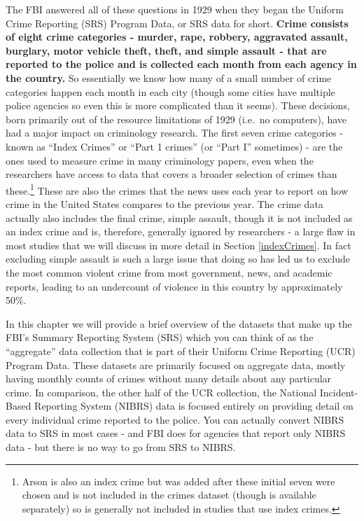 \documentclass[
]{krantz}
\begin{document}
The FBI answered all of these questions in 1929 when they
began the Uniform Crime Reporting (SRS) Program Data, or SRS
data for short. \textbf{Crime consists of eight crime
categories - murder, rape, robbery, aggravated assault,
burglary, motor vehicle theft, theft, and simple assault -
that are reported to the police and is collected each month
from each agency in the country.} So essentially we know how
many of a small number of crime categories happen each month
in each city (though some cities have multiple police
agencies so even this is more complicated than it seems).
These decisions, born primarily out of the resource
limitations of 1929 (i.e.~no computers), have had a major
impact on criminology research. The first seven crime
categories - known as ``Index Crimes'' or ``Part 1 crimes''
(or ``Part I'' sometimes) - are the ones used to measure
crime in many criminology papers, even when the researchers
have access to data that covers a broader selection of
crimes than these.\footnote{Arson is also an index crime but
  was added after these initial seven were chosen and is not
  included in the crimes dataset (though is available
  separately) so is generally not included in studies that
  use index crimes.} These are also the crimes that the news
uses each year to report on how crime in the United States
compares to the previous year. The crime data actually also
includes the final crime, simple assault, though it is not
included as an index crime and is, therefore, generally
ignored by researchers - a large flaw in most studies that
we will discuss in more detail in Section \ref{indexCrimes}.
In fact excluding simple assault is such a large issue that
doing so has led us to exclude the most common violent crime
from most government, news, and academic reports, leading to
an undercount of violence in this country by approximately
50\%.

In this chapter we will provide a brief overview of the
datasets that make up the FBI's Summary Reporting System
(SRS) which you can think of as the ``aggregate'' data
collection that is part of their Uniform Crime Reporting
(UCR) Program Data. These datasets are primarily focused on
aggregate data, mostly having monthly counts of crimes
without many details about any particular crime. In
comparison, the other half of the UCR collection, the
National Incident-Based Reporting System (NIBRS) data is
focused entirely on providing detail on every individual
crime reported to the police. You can actually convert NIBRS
data to SRS in most cases - and FBI does for agencies that
report only NIBRS data - but there is no way to go from SRS
to NIBRS.
\end{document}
